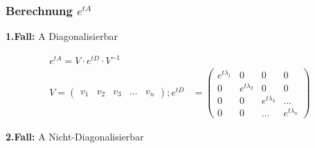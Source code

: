 \documentclass[10pt,a4paper]{article}
\begin{document}
\subsubsection{Berechnung $e^{tA}$}
\textbf{1.Fall:} A Diagonalisierbar
  \begin{mdframed}[style=exercise]
    \begin{align}
        e^{tA} = V \cdot e^{tD} \cdot V^{-1} \\
        V =
        \begin{pmatrix}
            v_1 & v_2 & v_3 & ... & v_n
        \end{pmatrix}; 
        e^{tD} &=
        \begin{pmatrix}
            e^{t\lambda_1}& 0    & 0  & 0 \\
             0  & e^{t\lambda_2}  & 0 & 0 \\
             0 & 0 & e^{t\lambda_3}& ... \\
             0 & 0& ... & e^{t\lambda_n} 
        \end{pmatrix}
    \end{align}
  \end{mdframed}
\textbf{2.Fall:} A Nicht-Diagonalisierbar
\end{document}
